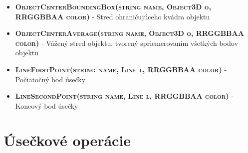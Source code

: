 \begin{itemize}
\item \textsc{\textbf{ObjectCenterBoundingBox(string name, Object3D o, RRGGBBAA color)}} - Stred ohraničujúceho kvádra objektu%

\item \textsc{\textbf{ObjectCenterAverage(string name, Object3D o, RRGGBBAA color)}} - Vážený stred objektu, tvorený spriemerovaním všetkých bodov objektu%

\item \textsc{\textbf{LineFirstPoint(string name, Line l, RRGGBBAA color)}} - Počiatočný bod úsečky%

\item \textsc{\textbf{LineSecondPoint(string name, Line l, RRGGBBAA color)}} - Koncový bod úsečky%

\end{itemize}

\section*{Úsečkové operácie}
		
